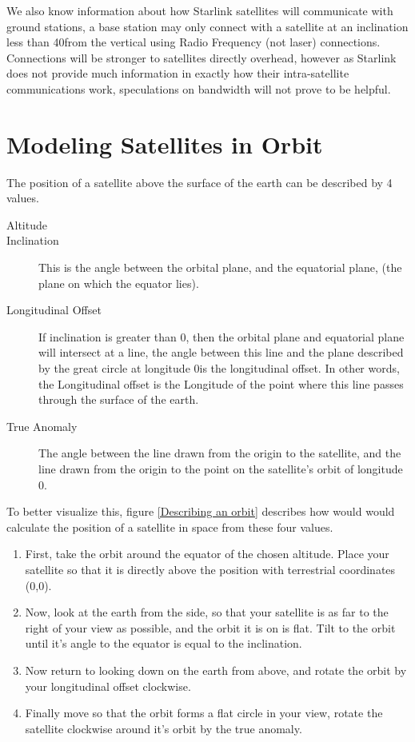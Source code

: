 \documentclass[12pt,a4paper,twoside,openright]{report}
\begin{document}
We also know information about how Starlink satellites will communicate with ground stations, a base station may only connect with a satellite at an inclination less than 40\degree from the vertical using Radio Frequency (not laser) connections. Connections will be stronger to satellites directly overhead, however as Starlink does not provide much information in exactly how their intra-satellite communications work, speculations on bandwidth will not prove to be helpful.

\section{Modeling Satellites in Orbit}

The position of a satellite above the surface of the earth can be described by 4 values. \cite{Book}

 \begin{description}
\item[Altitude]
\item[Inclination]
This is the angle between the orbital plane, and the equatorial plane, (the plane on which the equator lies).
\item[Longitudinal Offset]
If inclination is greater than 0\degree, then the orbital plane and equatorial plane will intersect at a line, the angle between this line and the plane described by the great circle at longitude 0\degree is the longitudinal offset. In other words, the Longitudinal offset is the Longitude of the point where this line passes through the surface of the earth.
\item[True Anomaly]
The angle between the line drawn from the origin to the satellite, and the line drawn from the origin to the point on the satellite's orbit of longitude 0.
\end{description}

To better visualize this, figure \ref{Describing an orbit} describes how would would calculate the position of a satellite in space from these four values.

\begin{enumerate}
\item First, take the orbit around the equator of the chosen altitude. Place your satellite so that it is directly above the position with terrestrial coordinates (0,0).
\item Now, look at the earth from the side, so that your satellite is as far to the right of your view as possible, and the orbit it is on is flat. Tilt to the orbit until it's angle to the equator is equal to the inclination.
\item Now return to looking down on the earth from above, and rotate the orbit by your longitudinal offset clockwise.
\item Finally move so that the orbit forms a flat circle in your view, rotate the satellite clockwise around it's orbit by the true anomaly.
\end{enumerate}
\end{document}
